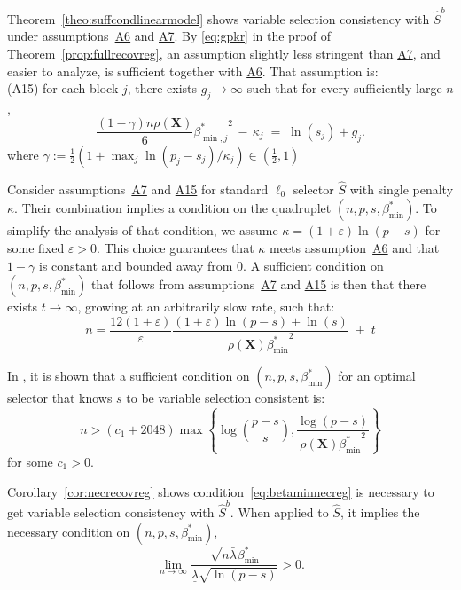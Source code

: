 \documentclass[bj,authoryear]{imsart}
\theoremstyle{plain}
\newcommand{\bs}{\boldsymbol}
\begin{document}
Theorem~\ref{theo:suffcondlinearmodel} shows variable selection consistency with $\hat{S}^b$ under assumptions~\hyperlink{lab:A6}{A6} and \hyperlink{lab:A7}{A7}. By \eqref{eq:gpkr} in the proof of Theorem~\ref{prop:fullrecovreg}, an assumption slightly less stringent than \hyperlink{lab:A7}{A7}, and easier to analyze, is sufficient together with \hyperlink{lab:A6}{A6}. That assumption is: \\[5pt]
\noindent\hypertarget{lab:A15}{(A15)} \quad for each block $j$, there exists $g_j\to \infty$ such that for every sufficiently large $n$,
    \begin{equation*}
        \frac{(1-\gamma) n\rho(\bs X)}{6}{\beta_{\min,j}^*}^2 \,- \,\kappa_j \;=\; \ln(s_j) + g_j .
    \end{equation*}
where $\gamma:=\tfrac12(1+\max_j\ln(p_j-s_j)/\kappa_j)\in (\tfrac12,1)$

Consider assumptions~\hyperlink{lab:A7}{A7} and \hyperlink{lab:A15}{A15} for standard $\ell_0$ selector $\hat{S}$ with single penalty $\kappa$. Their combination implies a condition on the quadruplet $(n,p,s,\beta_{\min}^*)$. To simplify the analysis of that condition, we assume $\kappa=(1+\varepsilon)\ln(p-s)$ for some fixed $\varepsilon>0$. This choice guarantees that $\kappa$ meets assumption~\hyperlink{lab:A6}{A6} and that $1-\gamma$ is constant and bounded away from 0. A sufficient condition on $(n,p,s,\beta_{\min}^*)$ that follows from assumptions~\hyperlink{lab:A7}{A7} and \hyperlink{lab:A15}{A15} is then that there exists $t\to \infty$, growing at an arbitrarily slow rate, such that:
\begin{equation}\label{eq:groh}
    n= \frac{12(1+\varepsilon)}{\varepsilon}\frac{(1+\varepsilon)\ln(p-s)+\ln(s)}{\rho(\bs X){\beta_{\min}^*}^2} \;+\;t
\end{equation}

In \cite{infotheowainwright}, it is shown that a sufficient condition on $(n,p,s,\beta_{\min}^*)$ for an optimal selector that knows $s$ to be variable selection consistent is:
\begin{equation}\label{eq:groh2}
    n > (c_1+2048) \max \left\{\log \binom{p-s}{s}, \frac{\log (p-s)}{\rho(\bs X) {\beta_{\min}^*}^2}\right\}
\end{equation}
for some $c_1 >0$. 

Corollary~\ref{cor:necrecovreg} shows condition~\eqref{eq:betaminnecreg} is necessary to get variable selection consistency with $\hat{S}^b$. When applied to $\hat{S}$, it implies the necessary condition on $(n,p,s,\beta_{\min}^*)$,
\begin{equation}\label{eq:gpiR}
\lim_{n\to\infty}\frac{\sqrt{n\bar{\lambda}}\beta_{\min}^*}{\underline{\lambda}\sqrt{\ln(p-s)}} > 0.
\end{equation}
\end{document}
